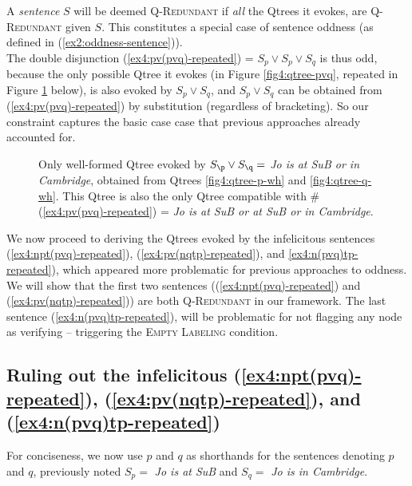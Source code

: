 A \textit{sentence} $S$ will be deemed \textsc{Q-Redundant} if \textit{all} the Qtrees it evokes, are \textsc{Q-Redundant} given $S$. This constitutes a special case of sentence oddness (as defined in (\ref{ex2:oddness-sentence})).\\

The double disjunction (\ref{ex4:pv(pvq)-repeated}) = $S_p \vee S_p \vee S_q$ is thus odd, because the only possible Qtree it evokes (in Figure \ref{fig4:qtree-pvq}, repeated in Figure \ref{fig4:qtree-pvq-repeated} below), is also evoked by $S_p \vee S_q$, and $S_p \vee S_q$ can be obtained from (\ref{ex4:pv(pvq)-repeated}) by substitution (regardless of bracketing). So our constraint captures the basic case case that previous approaches already accounted for.

\begin{figure}[H]\setlength{\fboxsep}{2pt}
	\centering
	\caption[]{Only well-formed Qtree evoked by $S\protect_\p \vee S\protect_\q =$ \textit{Jo is at SuB or in Cambridge}, obtained from Qtrees \ref{fig4:qtree-p-wh} and \ref{fig4:qtree-q-wh}. This Qtree is also the only Qtree compatible with \#(\ref{ex4:pv(pvq)-repeated}) = \textit{Jo is at SuB or at SuB or in Cambridge}.}\label{fig4:qtree-pvq-repeated}
\end{figure}

We now proceed to deriving the Qtrees evoked by the infelicitous sentences (\ref{ex4:npt(pvq)-repeated}), (\ref{ex4:pv(nqtp)-repeated}), and \ref{ex4:n(pvq)tp-repeated}), which appeared more problematic for previous approaches to oddness. We will show that the first two sentences ((\ref{ex4:npt(pvq)-repeated}) and (\ref{ex4:pv(nqtp)-repeated})) are both \textsc{Q-Redundant} in our framework. The last sentence (\ref{ex4:n(pvq)tp-repeated}), will be problematic for not flagging any node as verifying -- triggering the \textsc{Empty Labeling} condition.



\subsection{Ruling out the infelicitous (\ref{ex4:npt(pvq)-repeated}), (\ref{ex4:pv(nqtp)-repeated}), and (\ref{ex4:n(pvq)tp-repeated})}
For conciseness, we now use $p$ and $q$ as shorthands for the sentences denoting $p$ and $q$, previously noted $S_p = $ \textit{Jo is at SuB} and $S_q = $ \textit{Jo is in Cambridge}.

